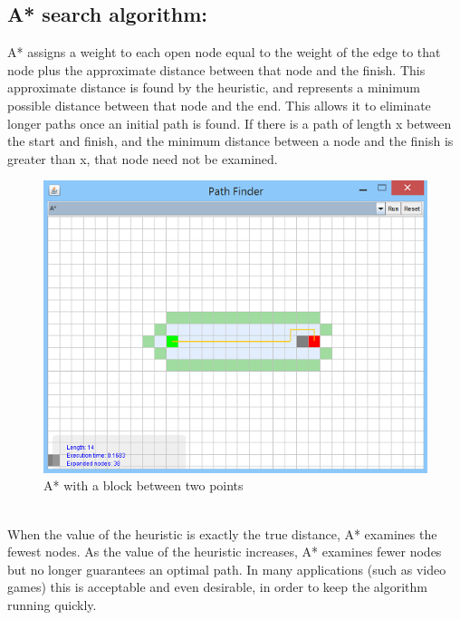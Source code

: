 \documentclass[a4paper]{article}
\begin{document}
\subsection{A* search algorithm:}

A* assigns a weight to each open node equal to the weight of the edge to that node plus the approximate distance between that node and the finish. This approximate distance is found by the heuristic, and represents a minimum possible distance between that node and the end. This allows it to eliminate longer paths once an initial path is found. If there is a path of length x between the start and finish, and the minimum distance between a node and the finish is greater than x, that node need not be examined. \\

\begin{figure}[h!]
  \centering
    \includegraphics[scale=.9]{images/A1.png}
  \caption{A* with a block between two points}
\end{figure}

\noindent \\
When the value of the heuristic is exactly the true distance, A* examines the fewest nodes. As the value of the heuristic increases, A* examines fewer nodes but no longer guarantees an optimal path. In many applications (such as video games) this is acceptable and even desirable, in order to keep the algorithm running quickly.

\end{document}
